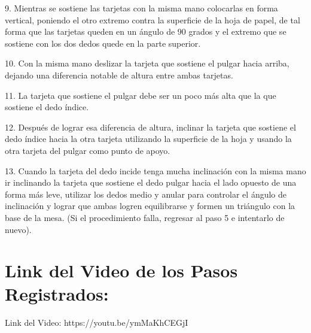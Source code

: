 \documentclass{article}
\begin{document}
9. Mientras se sostiene las tarjetas con la misma mano colocarlas en forma vertical, poniendo el otro extremo contra la superficie de la hoja de papel, de tal forma que las tarjetas queden en un ángulo de 90 grados y el extremo que se sostiene con los dos dedos quede en la parte superior.

10. Con la misma mano deslizar la tarjeta que sostiene el pulgar hacia arriba, dejando una diferencia notable de altura entre ambas tarjetas.

11. La tarjeta que sostiene el pulgar debe ser un poco más alta que la que sostiene el dedo índice.

12. Después de lograr esa diferencia de altura, inclinar la tarjeta que sostiene el dedo índice hacia la otra tarjeta utilizando la superficie de la hoja y usando la otra tarjeta del pulgar como punto de apoyo.

13. Cuando la tarjeta del dedo incide tenga mucha inclinación con la misma mano ir inclinando la tarjeta que sostiene el dedo pulgar hacia el lado opuesto de una forma más leve, utilizar los dedos medio y anular para controlar el ángulo de inclinación y lograr que ambas logren equilibrarse y formen un triángulo con la base de la mesa. (Si el procedimiento falla, regresar al paso 5 e intentarlo de nuevo).


\section{Link del Video de los Pasos Registrados:}Link del Video: https://youtu.be/ymMaKhCEGjI
\end{document}

